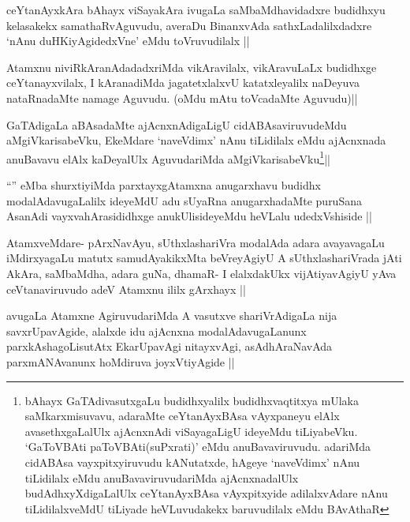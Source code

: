 \begin{artha}
ceYtanAyxkAra bAhayx viSayakAra ivugaLa saMbaMdhavidadxre budidhxyu kelasakekx samathaRvAguvudu, averaDu BinanxvAda sathxLadalilxdadxre `nAnu duHKiyAgidedxVne' eMdu toVruvudilalx ||
\end{artha}

\begin{artha}
Atamxnu niviRkAranAdadadxriMda vikAravilalx, vikAravuLaLx budidhxge ceYtanayxvilalx, I kAranadiMda jagatetxlalxvU katatxleyalilx naDeyuva nataRnadaMte namage Aguvudu. (oMdu mAtu toVcadaMte Aguvudu)||
\end{artha}

\begin{artha}
GaTAdigaLa aBAsadaMte ajAcnxnAdigaLigU cidABAsaviruvudeMdu aMgiVkarisabeVku, EkeMdare `naveVdimx' nAnu tiLidilalx eMdu ajAcnxnada anuBavavu elAlx kaDeyalUlx AguvudariMda aMgiVkarisabeVku\footnote[1]{bAhayx GaTAdivasutxgaLu budidhxyalilx budidhxvaqtitxya mUlaka saMkarxmisuvavu, adaraMte ceYtanAyxBAsa vAyxpaneyu elAlx avasethxgaLalUlx ajAcnxnAdi viSayagaLigU ideyeMdu tiLiyabeVku. `GaToVBAti paToVBAti(suPxrati)' eMdu anuBavaviruvudu. adariMda cidABAsa vayxpitxyiruvudu kANutatxde, hAgeye `naveVdimx' nAnu tiLidilalx eMdu anuBavaviruvudariMda ajAcnxnadalUlx budAdhxyXdigaLalUlx ceYtanAyxBAsa vAyxpitxyide adilalxvAdare nAnu tiLidilalxveMdU tiLiyade heVLuvudakekx baruvudilalx eMdu BAvAthaR}||
\end{artha}

\begin{artha}
``\stext'' eMba shurxtiyiMda parxtayxgAtamxna anugarxhavu budidhx modalAdavugaLalilx ideyeMdU adu sUyaRna anugarxhadaMte puruSana AsanAdi vayxvahArasididhxge anukUlisideyeMdu heVLalu udedxVshiside ||
\end{artha}

\begin{artha}
AtamxveMdare- pArxNavAyu, sUthxlashariVra modalAda adara avayavagaLu iMdirxyagaLu matutx samudAyakikxMta beVreyAgiyU A sUthxlashariVrada jAti AkAra, saMbaMdha, adara guNa, dhamaR- I elalxdakUkx vijAtiyavAgiyU yAva ceVtanaviruvudo adeV Atamxnu ililx gArxhayx ||
\end{artha}

\begin{artha}
avugaLa Atamxne AgiruvudariMda A vasutxve shariVrAdigaLa nija savxrUpavAgide, alalxde idu ajAcnxna modalAdavugaLanunx parxkAshagoLisutAtx EkarUpavAgi nitayxvAgi, asAdhAraNavAda parxmANAvanunx hoMdiruva joyxVtiyAgide ||
\end{artha}

